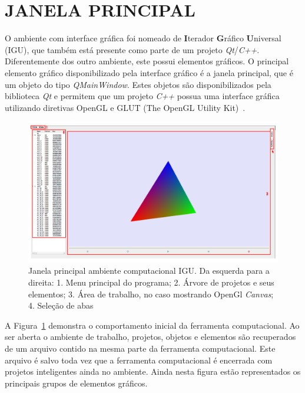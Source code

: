 \section{JANELA PRINCIPAL}\label{sec:janela}

O ambiente com interface gráfica foi nomeado de \textbf{I}terador \textbf{G}ráfico \textbf{U}niversal (IGU), que também está presente como parte de um projeto \textit{Qt}/\textit{C++}. Diferentemente dos outro ambiente, este possui elementos gráficos. O principal elemento gráfico disponibilizado pela interface gráfico é a janela principal, que é um objeto do tipo \textit{QMainWindow}. Estes objetos são disponibilizados pela biblioteca \textit{Qt} e permitem que um projeto \textit{C++} possua uma interface gráfica utilizando diretivas OpenGL e GLUT (The OpenGL Utility Kit)~\cite{OpenGL}.

\begin{figure}[!htbp]
	\centering
	\includegraphics[width=\linewidth]{Figures/IGU_001a.png}
	\caption{Janela principal ambiente computacional IGU. Da esquerda para a direita: 1. Menu principal do programa; 2. Árvore de projetos e seus elementos; 3. Área de trabalho, no caso mostrando OpenGl \textit{Canvas}; 4. Seleção de abas}
	\label{fig:UI}
\end{figure}

A Figura~\ref{fig:UI} demonstra o comportamento inicial da ferramenta computacional. Ao ser aberta o ambiente de trabalho, projetos, objetos e elementos são recuperados de um arquivo contido na mesma parte da ferramenta computacional. Este arquivo é salvo toda vez que a ferramenta computacional é encerrada com projetos inteligentes ainda no ambiente. Ainda nesta figura estão representados os principais grupos de elementos gráficos.

